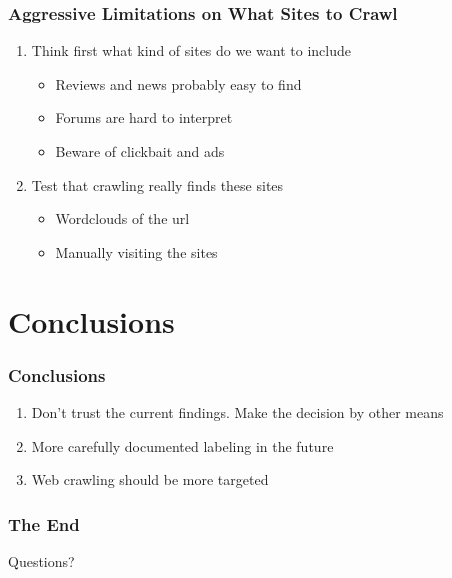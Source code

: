 \documentclass[10pt]{beamer}
\begin{document}
\begin{frame}
\frametitle{Aggressive Limitations on What Sites to Crawl}

\begin{enumerate}
    \item Think first what kind of sites do we want to include
    \begin{itemize}
        \item Reviews and news probably easy to find
        \item Forums are hard to interpret
        \item Beware of clickbait and ads
    \end{itemize}
    \item Test that crawling really finds these sites
    \begin{itemize}
        \item Wordclouds of the url
        \item Manually visiting the sites
    \end{itemize}
\end{enumerate}

\end{frame}

\section{Conclusions}

\begin{frame}
\frametitle{Conclusions}

\begin{enumerate}
    \item Don't trust the current findings. Make the decision by other means
    \item More carefully documented labeling in the future
    \item Web crawling should be more targeted
\end{enumerate}

\end{frame}

\begin{frame}
\frametitle{The End}

\LARGE{\centerline{Questions?}}

\end{frame}

\end{document}
